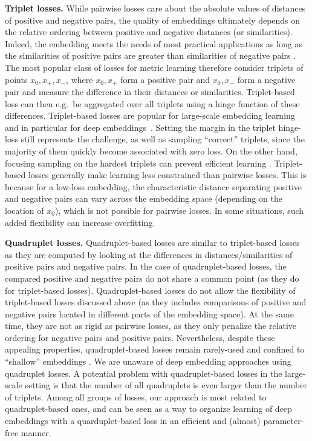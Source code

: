{\bf Triplet losses.} While pairwise losses care about the absolute values of distances of positive and negative pairs, the quality of embeddings ultimately depends on the relative ordering between positive and negative distances (or similarities). Indeed, the embedding meets the needs of most practical applications as long as the similarities of positive pairs are greater than similarities of negative pairs \citep{Schultz04,Weinberger09}. The most popular class of losses for metric learning therefore consider triplets of points $x_0,x_+,x_-$, where $x_0,x_+$ form a positive pair and $x_0,x_-$ form a negative pair and measure the difference in their distances or similarities. Triplet-based loss can then e.g.\ be aggregated over all triplets using a hinge function of these differences. Triplet-based losses are popular for large-scale embedding learning \citep{Chechik10} and in particular for deep embeddings~\citep{Parkhi15,Schroff15,Qian15,Zbontar15,Song16}. Setting the margin in the triplet hinge-loss still represents the challenge, as well as sampling ``correct'' triplets, since the majority of them quickly become associated with zero loss. On the other hand, focusing sampling on the hardest triplets can prevent efficient learning \citep{Schroff15}. Triplet-based losses generally make learning less constrained than pairwise losses. This is because for a low-loss embedding, the characteristic distance separating positive and negative pairs can vary across the embedding space (depending on the location of $x_0$), which is not possible for pairwise losses. In some situations, such added flexibility can increase overfitting.

{\bf Quadruplet losses.} Quadruplet-based losses are similar to triplet-based losses as they are computed by looking at the differences in distances/similarities of positive pairs and negative pairs. In the case of quadruplet-based losses, the compared positive and negative pairs do not share a common point (as they do for triplet-based losses). Quadruplet-based losses do not allow the flexibility of triplet-based losses discussed above (as they includes comparisons of positive and negative pairs located in different parts of the embedding space). At the same time, they are not as rigid as pairwise losses, as they only penalize the relative ordering for negative pairs and positive pairs. Nevertheless, despite these appealing properties, quadruplet-based losses remain rarely-used and confined to ``shallow'' embeddings \citep{Law13,Zheng13}. We are unaware of deep embedding approaches using quadruplet losses. A potential problem with quadruplet-based losses in the large-scale setting is that the number of all quadruplets is even larger than the number of triplets. Among all groups of losses, our approach is most related to quadruplet-based ones, and can be seen as a way to organize learning of deep embeddings with a quarduplet-based loss in an efficient and (almost) parameter-free manner.

